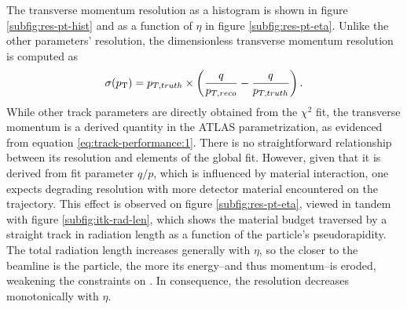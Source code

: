 \newpage
The transverse momentum resolution as a histogram is shown in figure \ref{subfig:res-pt-hist} and as a function of $\eta$ in figure \ref{subfig:res-pt-eta}.
Unlike the other parameters' resolution, the dimensionless transverse momentum resolution is computed as $$
\sigma(p_{\text{T}}) = p_{T,truth}  \times \left ( \frac{q}{p_{T, reco}} - \frac{q}{p_{T, truth}} \right).$$
While other track parameters are directly obtained from the $\chi^2$ fit, the transverse momentum is a derived quantity in the ATLAS parametrization, as evidenced from equation \eqref{eq:track-performance:1}. 
There is no straightforward relationship between its resolution and elements of the global fit.
However, given that it is derived from fit parameter $q/p$, which is influenced by material interaction, one expects degrading \pT resolution with more detector material encountered on the trajectory.
This effect is observed on figure \ref{subfig:res-pt-eta},  viewed in tandem with figure \ref{subfig:itk-rad-len}, which shows the material budget traversed by a straight track in radiation length as a function of the particle's pseudorapidity.
The total radiation length increases generally with $\eta$, so the closer to the beamline is the particle, the more its energy--and thus momentum--is eroded, weakening the constraints on \pT. 
In consequence, the \pT resolution decreases monotonically with $\eta$.

